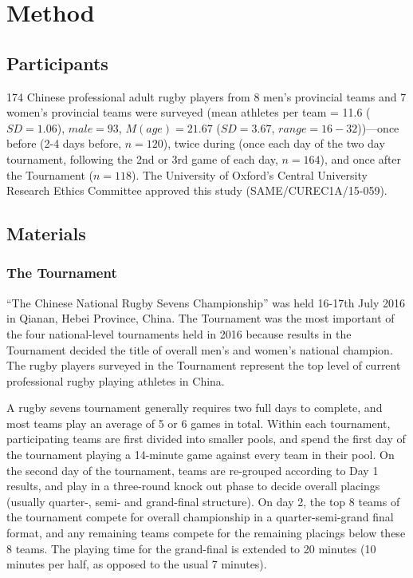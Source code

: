 \section{Method}

\subsection{Participants}
174 Chinese professional adult rugby players from 8 men’s provincial teams and 7 women’s provincial teams were surveyed  (mean athletes per team = 11.6 ($SD =1.06$), $male = 93$, $M(age) = 21.67$ ($SD = 3.67$, $range = 16 - 32$))---once before (2-4 days before, $n = 120$), twice during (once each day of the two day tournament, following the 2nd or 3rd game of each day, $n = 164$), and once after the Tournament ($n = 118$).  The University of Oxford’s Central University Research Ethics Committee approved this study (SAME/CUREC1A/15-059).


\subsection{Materials}

\subsubsection{The Tournament}
``The Chinese National Rugby Sevens Championship'' was held 16-17th July 2016 in Qianan, Hebei Province, China. The Tournament was the most important of the four national-level tournaments held in 2016 because results in the Tournament decided the title of overall men's and women’s national champion. The rugby players surveyed in the Tournament represent the top level of current professional rugby playing athletes in China.

A rugby sevens tournament generally requires two full days to complete, and most teams play an average of 5 or 6 games in total. Within each tournament, participating teams are first divided into smaller pools, and spend the first day of the tournament playing a 14-minute game against every team in their pool. On the second day of the tournament, teams are re-grouped according to Day 1 results, and play in a three-round knock out phase to decide overall placings (usually quarter-, semi- and grand-final structure). On day 2, the top 8 teams of the tournament compete for overall championship in a quarter-semi-grand final format, and any remaining teams compete for the remaining placings below these 8 teams. The playing time for the grand-final is extended to 20 minutes (10 minutes per half, as opposed to the usual 7 minutes).

